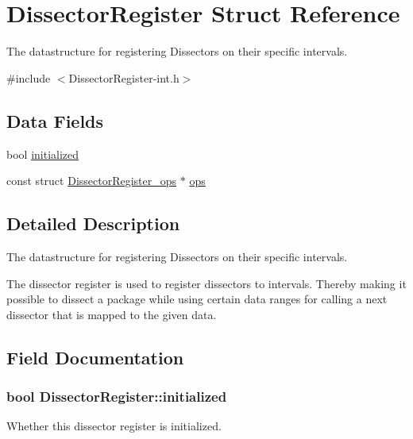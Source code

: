 \hypertarget{struct_dissector_register}{}\section{Dissector\+Register Struct Reference}
\label{struct_dissector_register}


The datastructure for registering Dissectors on their specific intervals.  




{\ttfamily \#include $<$Dissector\+Register-\/int.\+h$>$}

\subsection*{Data Fields}
\begin{DoxyCompactItemize}
\item 
bool \hyperlink{struct_dissector_register_ac11ffde1776843c94f5ff251ec54710b}{initialized}
\item 
const struct \hyperlink{struct_dissector_register__ops}{Dissector\+Register\+\_\+ops} $\ast$ \hyperlink{struct_dissector_register_acb5f585a3d5d7dbeca84a74990bbaad8}{ops}
\end{DoxyCompactItemize}


\subsection{Detailed Description}
The datastructure for registering Dissectors on their specific intervals. 

The dissector register is used to register dissectors to intervals. Thereby making it possible to dissect a package while using certain data ranges for calling a next dissector that is mapped to the given data. 

\subsection{Field Documentation}
\hypertarget{struct_dissector_register_ac11ffde1776843c94f5ff251ec54710b}{}
\subsubsection[{initialized}]{\setlength{\rightskip}{0pt plus 5cm}bool Dissector\+Register\+::initialized}\label{struct_dissector_register_ac11ffde1776843c94f5ff251ec54710b}
Whether this dissector register is initialized. \hypertarget{struct_dissector_register_acb5f585a3d5d7dbeca84a74990bbaad8}{}
